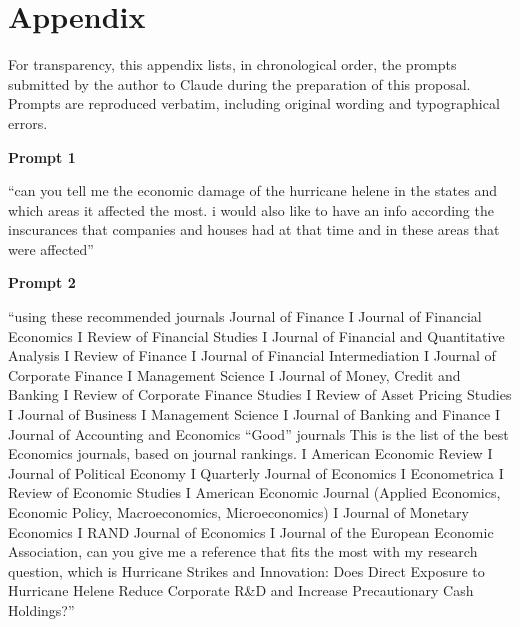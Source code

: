 \begingroup
\renewcommand{\thepage}{B-\arabic{page}}
\setcounter{page}{1}
\normalfont
\onehalfspacing
\raggedbottom
\setlength{\parindent}{0pt}
\setlength{\parskip}{0.5\baselineskip}

\section*{Appendix}

For transparency, this appendix lists, in chronological order, the prompts submitted by the author to Claude during the preparation of this proposal. Prompts are reproduced verbatim, including original wording and typographical errors.

\textbf{Prompt 1}\par\nopagebreak
{\itshape\raggedright
“can you tell me the economic damage of the hurricane helene in the states and which areas it affected the most. i would also like to have an info according the inscurances that companies and houses had at that time and in these areas that were affected”\par}

\textbf{Prompt 2}\par\nopagebreak
{\itshape\raggedright
“using these recommended journals Journal of Finance I Journal of Financial Economics I Review of Financial Studies I Journal of Financial and Quantitative Analysis I Review of Finance I Journal of Financial Intermediation I Journal of Corporate Finance I Management Science I Journal of Money, Credit and Banking I Review of Corporate Finance Studies I Review of Asset Pricing Studies I Journal of Business I Management Science I Journal of Banking and Finance I Journal of Accounting and Economics “Good” journals This is the list of the best Economics journals, based on journal rankings. I American Economic Review I Journal of Political Economy I Quarterly Journal of Economics I Econometrica I Review of Economic Studies I American Economic Journal (Applied Economics, Economic Policy, Macroeconomics, Microeconomics) I Journal of Monetary Economics I RAND Journal of Economics I Journal of the European Economic Association, can you give me a reference that fits the most with my research question, which is Hurricane Strikes and Innovation: Does Direct Exposure to Hurricane Helene Reduce Corporate R\&D and Increase Precautionary Cash Holdings?”\par}

